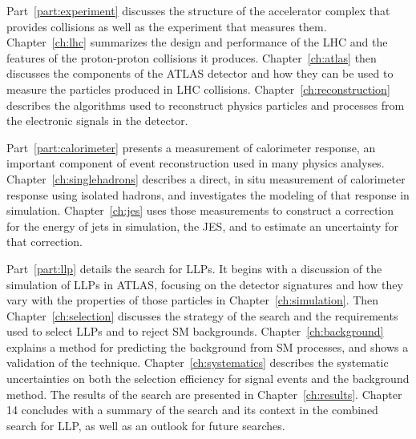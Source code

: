 Part~\ref{part:experiment} discusses the structure of the accelerator complex that provides collisions as well as the experiment that measures them.
Chapter~\ref{ch:lhc} summarizes the design and performance of the \ac{LHC} and the features of the proton-proton collisions it produces.
Chapter~\ref{ch:atlas} then discusses the components of the ATLAS detector and how they can be used to measure the particles produced in \ac{LHC} collisions.
Chapter~\ref{ch:reconstruction} describes the algorithms used to reconstruct physics particles and processes from the electronic signals in the detector.

Part~\ref{part:calorimeter} presents a measurement of calorimeter response, an important component of event reconstruction used in many physics analyses.
Chapter~\ref{ch:singlehadrons} describes a direct, in situ measurement of calorimeter response using isolated hadrons, and investigates the modeling of that response in simulation.
Chapter~\ref{ch:jes} uses those measurements to construct a correction for the energy of jets in simulation, the \ac{JES}, and to estimate an uncertainty for that correction.

Part~\ref{part:llp} details the search for \acp{LLP}.
It begins with a discussion of the simulation of \acp{LLP} in ATLAS, focusing on the detector signatures and how they vary with the properties of those particles in Chapter~\ref{ch:simulation}.
Then Chapter~\ref{ch:selection} discusses the strategy of the search and the requirements used to select \acp{LLP} and to reject \ac{SM} backgrounds.
Chapter~\ref{ch:background} explains a method for predicting the background from \ac{SM} processes, and shows a validation of the technique.
Chapter~\ref{ch:systematics} describes the systematic uncertainties on both the selection efficiency for signal events and the background method.
The results of the search are presented in Chapter~\ref{ch:results}. 
Chapter 14 concludes with a summary of the search and its context in the combined search for \ac{LLP}, as well as an outlook for future searches.


